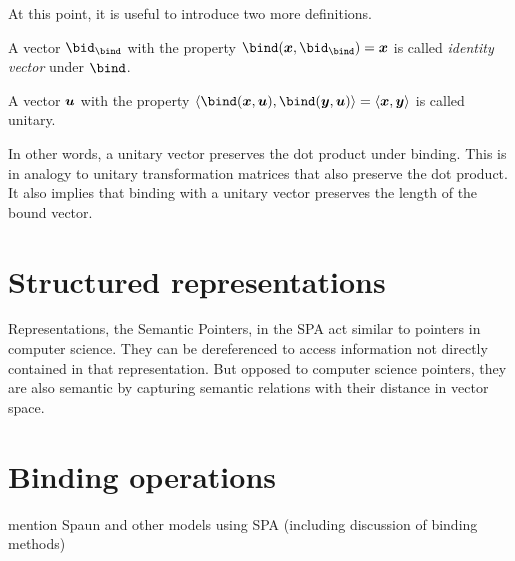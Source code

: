 At this point, it is useful to introduce two more definitions.
\begin{defn}
    A vector $\bid_{\bind}$ with the property $\bind(\vc x, \bid_{\bind}) = \vc x$ is called \emph{identity vector} under $\bind$.
\end{defn}
\begin{defn}
    A vector $\bm{u}$ with the property $\langle \bind(\vc x, \vc u), \bind(\vc y, \vc u) \rangle = \langle \vc x, \vc y \rangle$ is called unitary.
\end{defn}
In other words, a unitary vector preserves the dot product under binding.
This is in analogy to unitary transformation matrices that also preserve the dot product.
It also implies that binding with a unitary vector preserves the length of the bound vector.

\section{Structured representations}

Representations, the Semantic Pointers, in the SPA act similar to pointers in computer science.
They can be dereferenced to access information not directly contained in that representation.
But opposed to computer science pointers, they are also semantic by capturing semantic relations with their distance in vector space.

\section{Binding operations}


mention Spaun and other models using SPA
(including discussion of binding methods)
